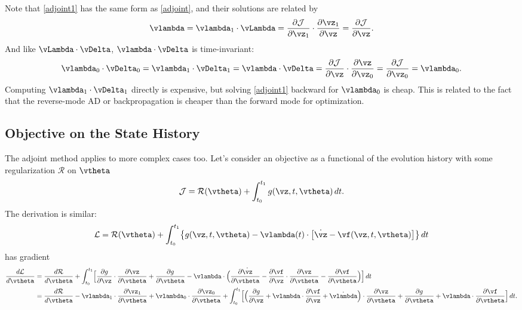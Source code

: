 \documentclass[modern, trackchanges, dvipsnames]{aastex631}
\renewcommand{\d}{d}
\newcommand{\p}{\partial}
\newcommand{\cJ}{\mathcal{J}}
\newcommand{\cR}{\mathcal{R}}
\newcommand{\cL}{\mathcal{L}}
\begin{document}
Note that \eqref{adjoint1} has the same form as \eqref{adjoint}, and
their solutions are related by
%
\begin{equation}
\vlambda = \vlambda_1 \cdot \vLambda
= \frac{\p\cJ}{\p\vz_1} \cdot \frac{\p\vz_1}{\p\vz}
= \frac{\p\cJ}{\p\vz}.
\end{equation}
And like $\vLambda \cdot \vDelta$, $\vlambda \cdot \vDelta$ is
time-invariant:
%
\begin{equation}
\vlambda_0 \cdot \vDelta_0
= \vlambda_1 \cdot \vDelta_1
= \vlambda \cdot \vDelta
= \frac{\p\cJ}{\p\vz} \cdot \frac{\p\vz}{\p\vz_0}
= \frac{\p\cJ}{\p\vz_0}
= \vlambda_0.
\end{equation}
%
Computing $\vlambda_1 \cdot \vDelta_1$ directly is expensive, but
solving \eqref{adjoint1} backward for $\vlambda_0$ is cheap.
This is related to the fact that the reverse-mode AD or backpropagation
is cheaper than the forward mode for optimization.


\vspace{1em}
\subsection{Objective on the State History}

The adjoint method applies to more complex cases too.
Let's consider an objective as a functional of the evolution history
with some regularization $\cR$ on $\vtheta$
%
\begin{equation}
\cJ = \cR(\vtheta) + \int_{t_0}^{t_1} g(\vz, t, \vtheta) \, \d t.
\end{equation}
%
The derivation is similar:
%
\begin{equation}
\cL = \cR(\vtheta)
+ \int_{t_0}^{t_1} \bigl\{ g(\vz, t, \vtheta) -
  \vlambda(t) \cdot \bigl[ \dot\vz - \vf(\vz, t, \vtheta) \bigr]
  \bigr\} \, \d t
\end{equation}
%
has gradient
%
\begin{align}
\frac{\d\cL}{\d\vtheta}
&= \frac{\d\cR}{\d\vtheta}
+ \int_{t_0}^{t_1} \Bigl[
    \frac{\p g}{\p\vz} \cdot \frac{\p\vz}{\p\vtheta}
    + \frac{\p g}{\p\vtheta}
    - \vlambda \cdot \Bigl( \frac{\p\dot\vz}{\p\vtheta}
    - \frac{\p\vf}{\p\vz} \cdot \frac{\p\vz}{\p\vtheta}
    - \frac{\p\vf}{\p\vtheta} \Bigr) \Bigr] \, \d t \\
%
&= \frac{\d\cR}{\d\vtheta}
- \vlambda_1 \cdot \frac{\p\vz_1}{\p\vtheta}
+ \vlambda_0 \cdot \frac{\p\vz_0}{\p\vtheta}
+ \int_{t_0}^{t_1} \Bigl[
  \Bigl( \frac{\p g}{\p\vz} + \vlambda \cdot \frac{\p\vf}{\p\vz}
    + \dot\vlambda \Bigr) \cdot \frac{\p\vz}{\p\vtheta}
  + \frac{\p g}{\p\vtheta} + \vlambda \cdot \frac{\p\vf}{\p\vtheta}
\Bigr] \, \d t. \nonumber
\end{align}
\end{document}
